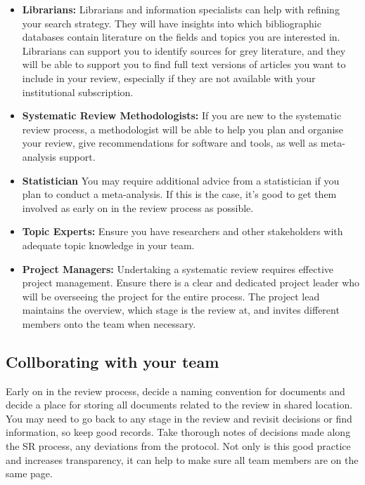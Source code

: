 \documentclass[
]{book}
\begin{document}
\begin{itemize}
\item
  \textbf{Librarians:} Librarians and information specialists can help with refining your search strategy. They will have insights into which bibliographic databases contain literature on the fields and topics you are interested in. Librarians can support you to identify sources for grey literature, and they will be able to support you to find full text versions of articles you want to include in your review, especially if they are not available with your institutional subscription.
\item
  \textbf{Systematic Review Methodologists:} If you are new to the systematic review process, a methodologist will be able to help you plan and organise your review, give recommendations for software and tools, as well as meta-analysis support.
\item
  \textbf{Statistician} You may require additional advice from a statistician if you plan to conduct a meta-analysis. If this is the case, it's good to get them involved as early on in the review process as possible.
\item
  \textbf{Topic Experts:} Ensure you have researchers and other stakeholders with adequate topic knowledge in your team.
\item
  \textbf{Project Managers:} Undertaking a systematic review requires effective project management. Ensure there is a clear and dedicated project leader who will be overseeing the project for the entire process. The project lead maintains the overview, which stage is the review at, and invites different members onto the team when necessary.
\end{itemize}

\hypertarget{collborating-with-your-team}{%
\subsection{Collborating with your team}\label{collborating-with-your-team}}

Early on in the review process, decide a naming convention for documents and decide a place for storing all documents related to the review in shared location. You may need to go back to any stage in the review and revisit decisions or find information, so keep good records. Take thorough notes of decisions made along the SR process, any deviations from the protocol. Not only is this good practice and increases transparency, it can help to make sure all team members are on the same page.
\end{document}
